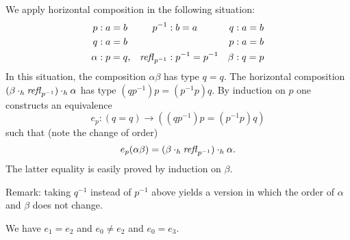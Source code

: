 \documentclass[english,a4]{article}
\begin{document}
We apply horizontal composition in the following situation:
%
\begin{align*}
  p &: a = b       &   p^{-1}       &: b=a           & q     &: a = b \\
  q &: a = b       &                &                & p     &: a = b \\
  \alpha &: p = q, &   \mathop{{\mathit{refl}}_{p^{-1}}}&: p^{-1}=p^{-1} & \beta &: q = p
\end{align*}
% 
In this situation, the composition $\alpha\beta$ has type $q=q$.
The horizontal composition $(\beta\cdot_h\mathop{{\mathit{refl}}_{p^{-1}}})\cdot_h\alpha$
has type $(qp^{-1})p = (p^{-1}p)q$. By induction on $p$ one constructs
an equivalence 
\[
e_p: (q=q)\to((qp^{-1})p = (p^{-1}p)q)
\]
such that (note the change of order) 
\[
e_p(\alpha\beta)=(\beta\cdot_h\mathop{{\mathit{refl}}_{p^{-1}}})\cdot_h\alpha.
\]
The latter equality is easily proved by induction on $\beta$.

Remark: taking $q^{-1}$ instead of $p^{-1}$ above yields a version
in which the order of $\alpha$ and $\beta$ does  not change.



\begin{lemma} We have $e_1 = e_2$ and $e_0 \neq e_2$ and $e_0 = e_3$.
\end{lemma}
\end{document}
